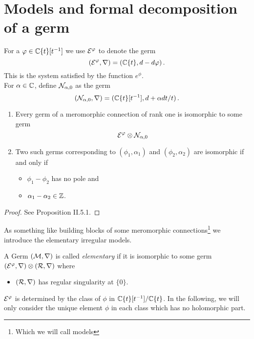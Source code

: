\section{Models and formal decomposition of a germ}
\begin{paracol}{2}\sloppy
\switchcolumn[0]\noindent
  For a $\varphi\in\mathbb{C}\{t\}[t^{-1}]$ we use $\mathcal{E}^{\varphi}$ to denote the germ
  \[
    (\mathcal{E}^{\varphi},\nabla)=(\mathbb{C}\{t\},d-d\varphi)\,.
  \]
  This is the system satisfied by the function $e^\phi$.
  \\For $\alpha\in\mathbb{C}$, define $\mathcal{N}_{\alpha,0}$ as the germ
  \[
    (\mathcal{N}_{\alpha,0},\nabla)=(\mathbb{C}\{t\}[t^{-1}],d+\alpha dt/t)\,.
  \]
  \begin{prop}
    \begin{enumerate}
      \item Every germ of a meromorphic connection of rank one is isomorphic to
        some germ
        \[
          \mathcal{E}^\varphi\otimes\mathcal{N}_{\alpha,0}
        \]
      \item Two such germs corresponding to $(\phi_1,\alpha_1)$ and
        $(\phi_2,\alpha_2)$ are isomorphic if and only if
        \begin{itemize}
          \item $\phi_1-\phi_2$ has no pole and
          \item $\alpha_1-\alpha_2\in\mathbb{Z}$.
        \end{itemize}
    \end{enumerate}
  \end{prop}
  \begin{proof}
    See \cite{sabbah2007isomonodromic} Proposition II.5.1.
  \end{proof}
\switchcolumn[1]\noindent
  As something like building blocks of some meromorphic
  connections\footnote{Which we will call models} we introduce the elementary
  irregular models.
  \begin{defn}
    A Germ $(\mathcal{M},\nabla)$ is called \emph{elementary} if it is isomorphic to
    some germ $(\mathcal{E}^\varphi,\nabla)\otimes(\mathcal{R},\nabla)$ where
    \begin{itemize}
      \item $(\mathcal{R},\nabla)$ has regular singularity at $\{0\}$.
    \end{itemize}
  \end{defn}
\end{paracol}
\begin{cor}
  $\mathcal{E}^\varphi$ is determined by the class of $\phi$ in
  $\mathbb{C}\{t\}[t^{-1}]/\mathbb{C}\{t\}$. In the following, we will only consider the
  unique element $\phi$ in each class which has no holomorphic part.
\end{cor}
